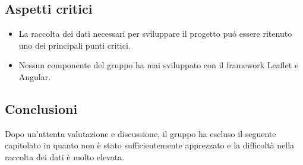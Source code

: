 \subsection{Aspetti critici}
\begin{itemize}
	\item La raccolta dei dati necessari per sviluppare il progetto pu\'o essere ritenuto uno dei principali punti critici.
	\item Nessun componente del gruppo ha mai sviluppato con il framework Leaflet e Angular.
\end{itemize}

\subsection{Conclusioni}
Dopo un'attenta valutazione e discussione, il gruppo ha escluso il seguente capitolato in quanto non è stato sufficientemente apprezzato e la difficoltà nella raccolta dei dati è molto elevata.
